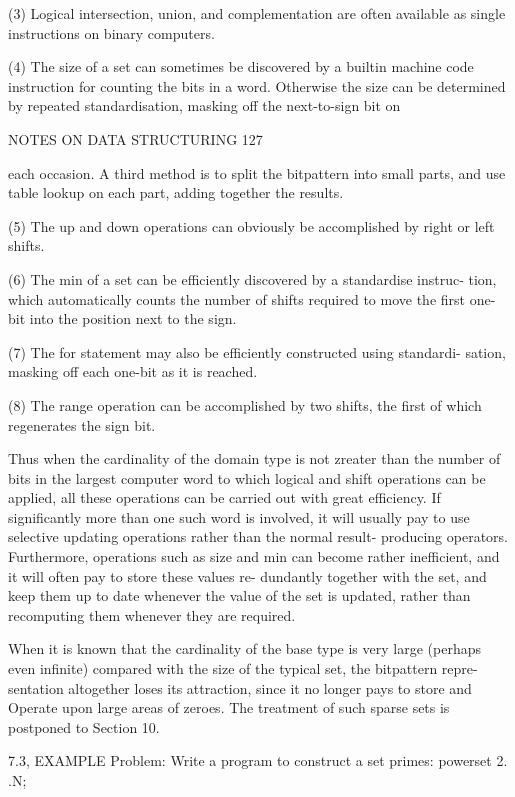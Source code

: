 {{{{				(3) Logical intersection, union, and complementation are often available as single instructions on binary computers.
				
				(4) The size of a set can sometimes be discovered by a builtin machine code instruction for counting the bits in a word. Otherwise the size can be determined by repeated standardisation, masking off the next-to-sign bit on
				
				NOTES ON DATA STRUCTURING 127
				
				each occasion. A third method is to split the bitpattern into small parts, and use table lookup on each part, adding together the results.
				
				(5) The up and down operations can obviously be accomplished by right or left shifts.
				
				(6) The min of a set can be efficiently discovered by a standardise instruc- tion, which automatically counts the number of shifts required to move the first one-bit into the position next to the sign.
				
				(7) The for statement may also be efficiently constructed using standardi- sation, masking off each one-bit as it is reached.
				
				(8) The range operation can be accomplished by two shifts, the first of which regenerates the sign bit.
				
				Thus when the cardinality of the domain type is not zreater than the number of bits in the largest computer word to which logical and shift operations can be applied, all these operations can be carried out with great efficiency. If significantly more than one such word is involved, it will usually pay to use selective updating operations rather than the normal result- producing operators. Furthermore, operations such as size and min can become rather inefficient, and it will often pay to store these values re- dundantly together with the set, and keep them up to date whenever the value of the set is updated, rather than recomputing them whenever they are required.
				
				When it is known that the cardinality of the base type is very large (perhaps even infinite) compared with the size of the typical set, the bitpattern repre- sentation altogether loses its attraction, since it no longer pays to store and Operate upon large areas of zeroes. The treatment of such sparse sets is postponed to Section 10.
				
				7.3, EXAMPLE Problem: Write a program to construct a set primes: powerset 2. .N;
				
}}}}
